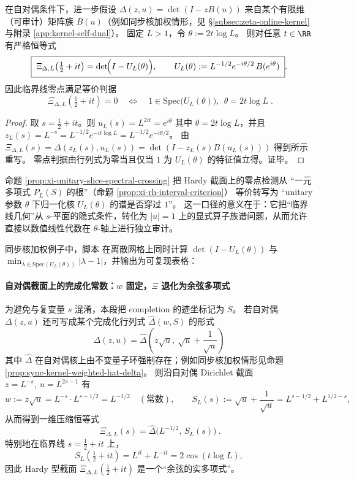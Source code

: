 \begin{proposition}\label{prop:xi-unitary-slice-spectral-crossing}
在自对偶条件下，进一步假设
\(
\Delta(z,u)=\det(I-zB(u))
\)
来自某个有限维（可审计）矩阵族 \(B(u)\)（例如同步核加权情形，见 \S\ref{subsec:zeta-online-kernel} 与附录 \ref{app:kernel-self-dual}）。
固定 \(L>1\)，令 \(\theta:=2t\log L\)。
则对任意 \(t\in\RR\) 有严格恒等式
\[
\boxed{\;
\Xi_{\Delta,L}\!\left(\tfrac12+it\right)
=
\det\!\Bigl(I-U_L(\theta)\Bigr),\qquad
U_L(\theta):=L^{-1/2}e^{-i\theta/2}\,B(e^{i\theta})\; }.
\]
因此临界线零点满足等价判据
\[
\boxed{\;
\Xi_{\Delta,L}\!\left(\tfrac12+it\right)=0
\quad\Longleftrightarrow\quad
1\in\mathrm{Spec}\bigl(U_L(\theta)\bigr),\ \ \theta=2t\log L\; }.
\]
\end{proposition}
\begin{proof}
取 \(s=\tfrac12+it\)。则
\(
u_L(s)=L^{2it}=e^{i\theta}
\)
其中 \(\theta=2t\log L\)，并且
\(
z_L(s)=L^{-s}=L^{-1/2}e^{-it\log L}=L^{-1/2}e^{-i\theta/2}
\)。
由 \(\Xi_{\Delta,L}(s)=\Delta(z_L(s),u_L(s))=\det(I-z_L(s)B(u_L(s)))\) 得到所示重写。
零点判据由行列式为零当且仅当 \(1\) 为 \(U_L(\theta)\) 的特征值立得。证毕。
\end{proof}

\begin{remark}\label{rem:xi-unitary-slice-operator-audit}
命题 \ref{prop:xi-unitary-slice-spectral-crossing} 把 Hardy 截面上的零点检测从
“一元多项式 \(P_L(S)\) 的根”（命题 \ref{prop:xi-rh-interval-criterion}）
等价转写为
“unitary 参数 \(\theta\) 下归一化核 \(U_L(\theta)\) 的谱是否穿过 \(1\)”。
这一口径的意义在于：它把“临界线几何”从 \(s\)-平面的隐式条件，转化为 \(|u|=1\) 上的显式算子族谱问题，从而允许直接以数值线性代数在 \(\theta\)-轴上进行独立审计。
\par
同步核加权例子中，脚本  在离散网格上同时计算
\(\det(I-U_L(\theta))\) 与 \(\min_{\lambda\in\mathrm{Spec}(U_L(\theta))}|\lambda-1|\)，并输出为可复现表格：

\end{remark}

\paragraph{自对偶截面上的完成化常数：\texorpdfstring{$w$}{w} 固定，\texorpdfstring{$\Xi$}{Xi} 退化为余弦多项式}
为避免与复变量 \(s\) 混淆，本段把 completion 的迹坐标记为 \(S\)。
若自对偶 \(\Delta(z,u)\) 还可写成某个完成化行列式
\(\widehat\Delta(w,S)\) 的形式
\[
\Delta(z,u)=\widehat\Delta\!\left(z\sqrt{u},\ \sqrt{u}+\frac{1}{\sqrt{u}}\right)
\]
其中 \(\widehat\Delta\) 在自对偶核上由不变量子环强制存在；例如同步核加权情形见命题 \ref{prop:sync-kernel-weighted-hat-delta}。
则沿自对偶 Dirichlet 截面 \(z=L^{-s},\ u=L^{2s-1}\) 有
\[
w:=z\sqrt{u}=L^{-s}\cdot L^{s-1/2}=L^{-1/2}\quad(\text{常数}),
\qquad
S_L(s):=\sqrt{u}+\frac{1}{\sqrt{u}}=L^{s-1/2}+L^{1/2-s},
\]
从而得到一维压缩恒等式
\[
\boxed{\ \Xi_{\Delta,L}(s)=\widehat\Delta\!\bigl(L^{-1/2},\,S_L(s)\bigr)\ }.
\]
特别地在临界线 \(s=\tfrac12+it\) 上，
\[
S_L\!\left(\tfrac12+it\right)=L^{it}+L^{-it}=2\cos(t\log L),
\]
因此 Hardy 型截面 \(\Xi_{\Delta,L}(\tfrac12+it)\) 是一个“余弦的实多项式”。

